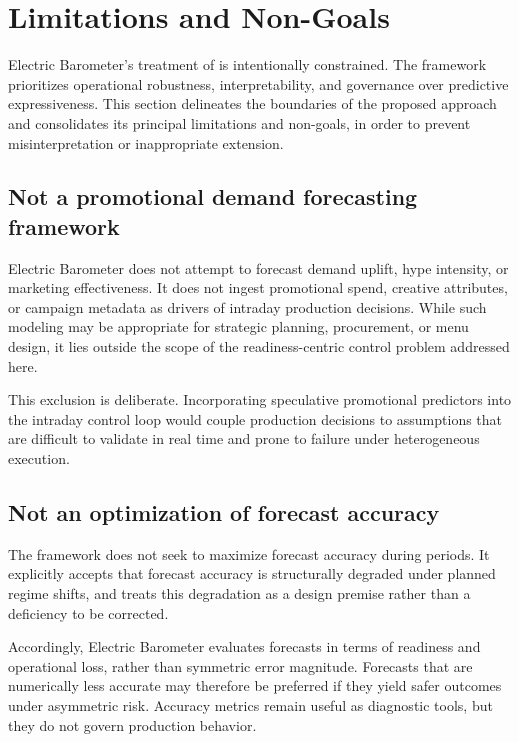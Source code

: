 
\section{Limitations and Non-Goals}
\label{sec:limitations}

Electric Barometer’s treatment of \LTOs{} is intentionally constrained. The framework prioritizes
operational robustness, interpretability, and governance over predictive expressiveness. This
section delineates the boundaries of the proposed approach and consolidates its principal
limitations and non-goals, in order to prevent misinterpretation or inappropriate extension.

\subsection{Not a promotional demand forecasting framework}
\label{subsec:not-demand-forecasting}

Electric Barometer does not attempt to forecast \LTO{} demand uplift, hype intensity, or marketing
effectiveness. It does not ingest promotional spend, creative attributes, or campaign metadata as
drivers of intraday production decisions. While such modeling may be appropriate for strategic
planning, procurement, or menu design, it lies outside the scope of the readiness-centric control
problem addressed here.

This exclusion is deliberate. Incorporating speculative promotional predictors into the intraday
control loop would couple production decisions to assumptions that are difficult to validate in real
time and prone to failure under heterogeneous execution.

\subsection{Not an optimization of forecast accuracy}
\label{subsec:not-accuracy-optimization}

The framework does not seek to maximize forecast accuracy during \LTO{} periods. It explicitly
accepts that forecast accuracy is structurally degraded under planned regime shifts, and treats this
degradation as a design premise rather than a deficiency to be corrected.

Accordingly, Electric Barometer evaluates forecasts in terms of readiness and operational loss,
rather than symmetric error magnitude. Forecasts that are numerically less accurate may therefore
be preferred if they yield safer outcomes under asymmetric risk. Accuracy metrics remain useful as
diagnostic tools, but they do not govern production behavior.

